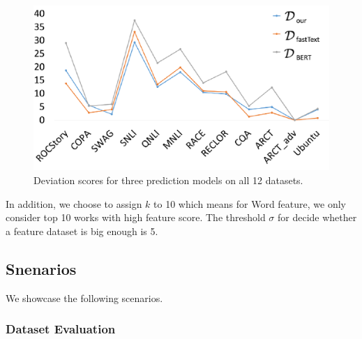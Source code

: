 \begin{figure}[th]
\centering
\includegraphics[width=1.0\columnwidth]{picture/d_figure.pdf}
\caption{Deviation scores for three prediction models on all 12 datasets.}
\label{fig:d_figure}
\end{figure}
 In addition, we choose to assign $k$ to 10 which means for Word feature, we only consider 
top 10 works with high feature score. 
The threshold $\sigma$ for decide whether a feature dataset is 
big enough is 5. 

\subsection{Snenarios}
We showcase the following scenarios.
\subsubsection{Dataset Evaluation}

